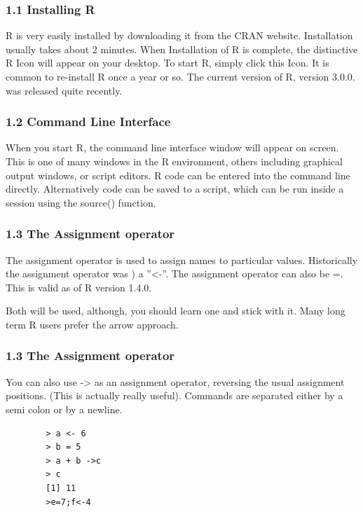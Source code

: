 \documentclass{beamer}
\begin{document}
	\begin{frame}
		\frametitle{1.1 Installing R}
		R is very easily installed by downloading it from the CRAN website. Installation usually takes
		about 2 minutes. When Installation of R is complete, the distinctive R Icon will appear on your
		desktop. To start R, simply click this Icon. It is common to re-install R once a year or so. The
		current version of R, version 3.0.0. was released quite recently.
	\end{frame}
	\begin{frame}
		
		\frametitle{1.2 Command Line Interface}
		When you start R, the command line interface window will appear on screen. This is one
		of many windows in the R environment, others including graphical output windows, or script
		editors. R code can be entered into the command line directly. Alternatively code can be saved
		to a script, which can be run inside a session using the source() function.
	\end{frame}
	\begin{frame}
		\frametitle{1.3 The Assignment operator}
		The assignment operator is used to assign names to particular values. Historically the assignment
		operator was ) a ”<-”. The assignment operator can also be =. This is valid as of R
		version 1.4.0.
		
		Both will be used, although, you should learn one and stick with it. Many long term R
		users prefer the arrow approach. 
	\end{frame}
	\begin{frame}[fragile]
		\frametitle{1.3 The Assignment operator}
		
		You can also use -> as an assignment operator, reversing the
		usual assignment positions. (This is actually really useful). Commands are separated either by
		a semi colon or by a newline.
		\begin{framed}
		\begin{verbatim}
		> a <- 6
		> b = 5
		> a + b ->c
		> c
		[1] 11
		>e=7;f<-4
		\end{verbatim}
		\end{framed}
	\end{frame}
\end{document}

